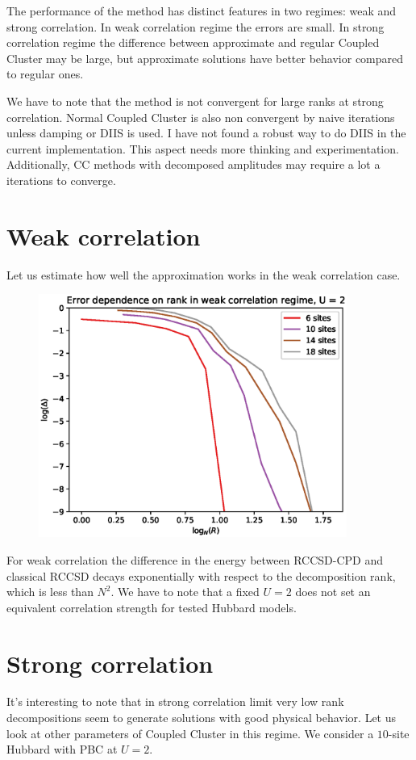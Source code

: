 \documentclass[a4paper,10pt]{article}
\begin{document}
The performance of the method has distinct features in two regimes: weak and 
strong correlation. In weak correlation regime the errors are small. In strong
correlation regime the difference between approximate and regular Coupled Cluster
may be large, but approximate solutions have better behavior compared to regular ones.

We have to note that the method is not convergent for large ranks at strong correlation.
Normal Coupled Cluster is also non convergent by naive iterations unless damping or 
DIIS is used. I have not found a robust way to do DIIS in the current implementation. 
This aspect needs more thinking and experimentation. Additionally, CC methods with 
decomposed amplitudes may require a lot a iterations to converge.
\section{Weak correlation}
Let us estimate how well the approximation works in the weak correlation case. 

\begin{figure}[!htb]
\centering
\includegraphics[width=0.9\textwidth]{figures/err_vs_r_u_2_cpd.eps}
\end{figure}

For weak correlation the difference in the energy between RCCSD-CPD and classical RCCSD
decays exponentially with respect to the decomposition rank, which is less than $N^2$. 
We have to note that a fixed $U=2$ does not set an equivalent correlation strength
for tested Hubbard models.

\section{Strong correlation}
It's interesting to note that in strong correlation limit very low rank decompositions 
seem to generate solutions with good physical behavior. Let us look at other 
parameters of Coupled Cluster in this regime. We consider a $10$-site Hubbard with PBC at $U=2$.
\end{document}
